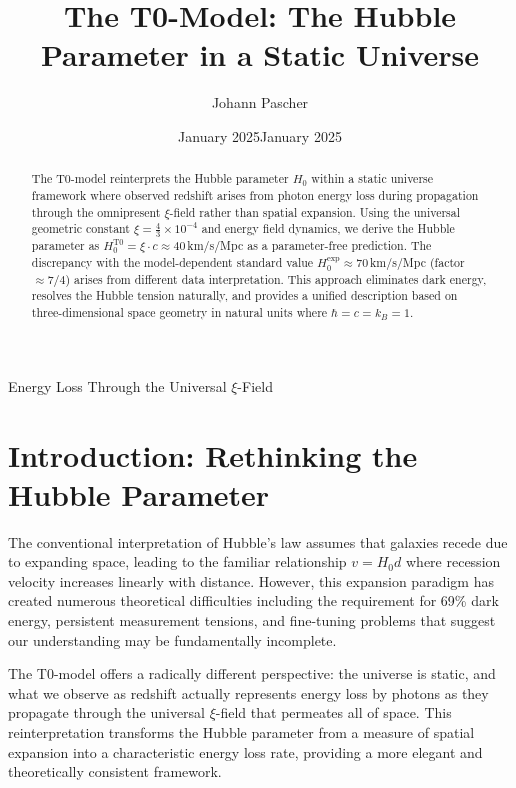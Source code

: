 \documentclass[12pt,a4paper]{report}
\author{}
\date{January 2025}
\begin{document}
\hfuzz=200pt
\allowdisplaybreaks

\title{The T0-Model: The Hubble Parameter in a Static Universe \\}
\maketitle
		Energy Loss Through the Universal $\xi$-Field
	\author{Johann Pascher}
	\date{January 2025}

	\begin{abstract}
		The T0-model reinterprets the Hubble parameter $H_0$ within a static universe framework where observed redshift arises from photon energy loss during propagation through the omnipresent $\xi$-field rather than spatial expansion. Using the universal geometric constant $\xi = \frac{4}{3} \times 10^{-4}$ and energy field dynamics, we derive the Hubble parameter as $H_0^{\text{T0}} = \xi \cdot c \approx 40\,$km/s/Mpc as a parameter-free prediction. The discrepancy with the model-dependent standard value $H_0^{\text{exp}} \approx 70\,$km/s/Mpc (factor $\approx 7/4$) arises from different data interpretation. This approach eliminates dark energy, resolves the Hubble tension naturally, and provides a unified description based on three-dimensional space geometry in natural units where $\hbar = c = k_B = 1$.
	\end{abstract}
	
	\tableofcontents

	\section{Introduction: Rethinking the Hubble Parameter}
	
	The conventional interpretation of Hubble's law assumes that galaxies recede due to expanding space, leading to the familiar relationship $v = H_0 d$ where recession velocity increases linearly with distance. However, this expansion paradigm has created numerous theoretical difficulties including the requirement for 69\% dark energy, persistent measurement tensions, and fine-tuning problems that suggest our understanding may be fundamentally incomplete.
	
	The T0-model offers a radically different perspective: the universe is static, and what we observe as redshift actually represents energy loss by photons as they propagate through the universal $\xi$-field that permeates all of space. This reinterpretation transforms the Hubble parameter from a measure of spatial expansion into a characteristic energy loss rate, providing a more elegant and theoretically consistent framework.
	
\end{document}
